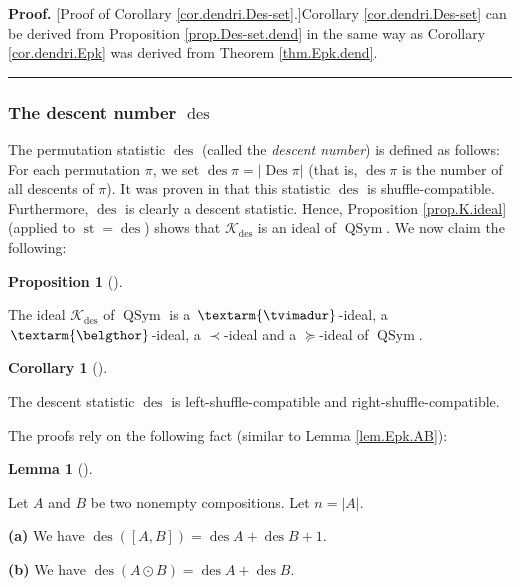 \documentclass[numbers=enddot,12pt,final,onecolumn,notitlepage]{scrartcl}%
\theoremstyle{definition}
\newtheorem{lem}[theo]{Lemma}
\newenvironment{lemma}[1][]
{\begin{lem}[#1]\begin{leftbar}}
{\end{leftbar}\end{lem}}
\newtheorem{prop}[theo]{Proposition}
\newenvironment{proposition}[1][]
{\begin{prop}[#1]\begin{leftbar}}
{\end{leftbar}\end{prop}}
\newtheorem{coro}[theo]{Corollary}
\newenvironment{corollary}[1][]
{\begin{coro}[#1]\begin{leftbar}}
{\end{leftbar}\end{coro}}
\newenvironment{proof}[1][Proof]{\noindent\textbf{#1.} }{\ \rule{0.5em}{0.5em}}
\newenvironment{verlong}{}{}
\newcommand{\tvi}{\left. \textarm{\tvimadur} \right.}
\newcommand{\bel}{\left. \textarm{\belgthor} \right.}
\begin{document}
\begin{verlong}
\begin{proof}
[Proof of Corollary \ref{cor.dendri.Des-set}.]Corollary
\ref{cor.dendri.Des-set} can be derived from Proposition
\ref{prop.Des-set.dend} in the same way as Corollary \ref{cor.dendri.Epk} was
derived from Theorem \ref{thm.Epk.dend}.
\end{proof}

\subsubsection{The descent number $\operatorname*{des}$}

The permutation statistic $\operatorname*{des}$ (called the \textit{descent
number}) is defined as follows: For each permutation $\pi$, we set
$\operatorname*{des}\pi=\left\vert \operatorname*{Des}\pi\right\vert $ (that
is, $\operatorname*{des}\pi$ is the number of all descents of $\pi$). It was
proven in \cite[Theorem 4.6 \textbf{(a)}]{part1} that this statistic
$\operatorname*{des}$ is shuffle-compatible. Furthermore, $\operatorname*{des}%
$ is clearly a descent statistic. Hence, Proposition \ref{prop.K.ideal}
(applied to $\operatorname*{st}=\operatorname*{des}$) shows that
$\mathcal{K}_{\operatorname*{des}}$ is an ideal of $\operatorname*{QSym}$. We
now claim the following:

\begin{proposition}
\label{prop.des.dend}The ideal $\mathcal{K}_{\operatorname*{des}}$ of
$\operatorname*{QSym}$ is a $\tvi$-ideal, a $\bel$-ideal, a $\left.
\prec\right.  $-ideal and a $\left.  \succeq\right.  $-ideal of
$\operatorname*{QSym}$.
\end{proposition}

\begin{corollary}
\label{cor.dendri.des}The descent statistic $\operatorname*{des}$ is
left-shuffle-compatible and right-shuffle-compatible.
\end{corollary}

The proofs rely on the following fact (similar to Lemma \ref{lem.Epk.AB}):

\begin{lemma}
\label{lem.des.AB}Let $A$ and $B$ be two nonempty compositions. Let
$n=\left\vert A\right\vert $.

\textbf{(a)} We have $\operatorname*{des}\left(  \left[  A,B\right]  \right)
=\operatorname*{des}A+\operatorname*{des}B+1$.

\textbf{(b)} We have $\operatorname*{des}\left(  A\odot B\right)
=\operatorname*{des}A+\operatorname*{des}B$.
\end{lemma}


\end{verlong}
\end{document}
